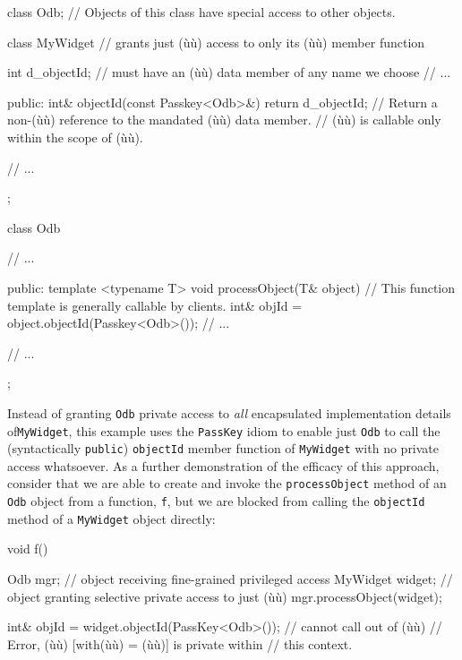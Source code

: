 \begin{emcppslisting}[emcppsbatch=e3]
class Odb;      // Objects of this class have special access to other objects.

class MyWidget  // grants just (ù{}ù) access to only its (ù{}ù) member function
{
    int d_objectId;  // must have an (ù{}ù) data member of any name we choose
    // ...

public:
    int& objectId(const Passkey<Odb>&) { return d_objectId; }
        // Return a non-(ù{}ù) reference to the mandated (ù{}ù) data member.
        // (ù{}ù) is callable only within the scope of (ù{}ù).

    // ...
};

class Odb
{
    // ...

public:
    template <typename T>
    void processObject(T& object)
        // This function template is generally callable by clients.
    {
        int& objId = object.objectId(Passkey<Odb>());
        // ...
    }

    // ...
};
\end{emcppslisting}
    
\noindent Instead of granting \lstinline!Odb! private access to \emph{all}
encapsulated implementation details of\linebreak[4] \mbox{\lstinline!MyWidget!}, this example
uses the \lstinline!PassKey! idiom to enable just \lstinline!Odb! to call the
(syntactically \lstinline!public!) \lstinline!objectId! member function of
\lstinline!MyWidget! with no private access whatsoever. As a further
demonstration of the efficacy of this approach, consider that we are
able to create and invoke the \lstinline!processObject! method of an
\lstinline!Odb! object from a function, \lstinline!f!, but we are blocked from
calling the \lstinline!objectId! method of a \lstinline!MyWidget! object
directly:

\begin{emcppslisting}[emcppsbatch=e3]
void f()
{
    Odb mgr;          // object receiving fine-grained privileged access
    MyWidget widget;  // object granting selective private access to just (ù{}ù)
    mgr.processObject(widget);

    int& objId = widget.objectId(PassKey<Odb>());  // cannot call out of (ù{}ù)
       // Error, (ù{}ù) [with(ù{}ù) = (ù{}ù)] is private within
       // this context.
}
\end{emcppslisting}
    
